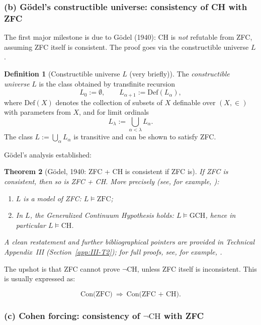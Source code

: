\documentclass[11pt]{book}
\theoremstyle{plain}
\newtheorem{theorem}{Theorem}[chapter]      \newtheorem{proposition}[theorem]{Proposition} \newtheorem{lemma}[theorem]{Lemma}          \newtheorem{corollary}[theorem]{Corollary}
\theoremstyle{definition}
\newtheorem{definition}[theorem]{Definition} \theoremstyle{remark}
\begin{document}
\subsubsection*{(b) Gödel's constructible universe: consistency of CH with ZFC}

The first major milestone is due to Gödel (1940): CH is \emph{not}
refutable from ZFC, assuming ZFC itself is consistent. The proof goes
via the constructible universe $L$.

\begin{definition}[Constructible universe $L$ (very briefly)]
  The \emph{constructible universe} $L$ is the class obtained by
  transfinite recursion
  \[
    L_0 := \emptyset,\qquad
    L_{\alpha+1} := \mathrm{Def}(L_\alpha),
  \]
  where $\mathrm{Def}(X)$ denotes the collection of subsets of $X$
  definable over $(X,\in)$ with parameters from $X$, and for limit
  ordinals
  \[
    L_\lambda := \bigcup_{\alpha<\lambda} L_\alpha.
  \]
  The class $L := \bigcup_{\alpha} L_\alpha$ is transitive and can be
  shown to satisfy ZFC.
\end{definition}

Gödel's analysis established:

\begin{theorem}[Gödel, 1940: ZFC + CH is consistent if ZFC is]
  If ZFC is consistent, then so is ZFC + CH. More precisely (see, for example, \cite{Godel1940,Jech2003}):
  \begin{enumerate}[label=\roman*)]
    \item $L$ is a model of ZFC: $L\models\text{ZFC}$;
    \item In $L$, the Generalized Continuum Hypothesis holds:
          $L\models\text{GCH}$, hence in particular $L\models\text{CH}$.
  \end{enumerate}
  A clean restatement and further bibliographical pointers are provided
  in Technical Appendix~III (Section~\ref{app:III-T2}); for full proofs,
  see, for example, \cite{Godel1940,Jech2003}.
\end{theorem}

The upshot is that ZFC cannot prove $\neg\text{CH}$, unless ZFC itself
is inconsistent. This is usually expressed as:

\[
  \text{Con(ZFC)} \ \Longrightarrow\ \text{Con(ZFC + CH)}.
\]



\subsubsection*{(c) Cohen forcing: consistency of $\neg\text{CH}$ with ZFC}
\end{document}
